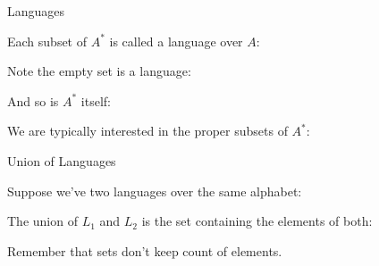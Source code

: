 \begin{frame}{Languages}

  \vspace{2mm}

  Each subset of $A^*$ is called a language over $A$:


  \vspace{2mm}

  Note the empty set is a language:


  \vspace{2mm}

  And so is $A^*$ itself:


  \vspace{2mm}

  We are typically interested in the \textcolor{gmitblue}{proper} subsets of $A^*$:


\end{frame}


\begin{frame}{Union of Languages}

  \vspace{2mm}

  Suppose we've two languages over the same alphabet:


  

  \vspace{2mm}

  The union of $L_1$ and $L_2$ is the set containing the elements of both:


  \vspace{2mm}

  Remember that sets don't keep count of elements.

\end{frame}

